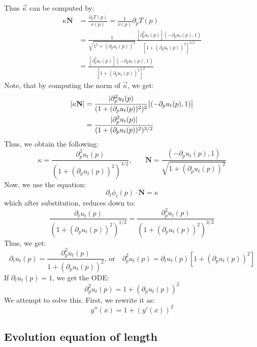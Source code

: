\documentclass{article}
\begin{document}
Thus $\vec{\kappa}$ can be computed by:
\begin{align*}
    \kappa\mathbf{N} &= \frac{\partial_p T(p)}{\nu(p)} = \frac{1}{\nu(p)}\partial_p T(p) \\
        &= \frac{1}{\sqrt{1^2 + (\partial_p u_t(p))^2}}\frac{[\partial_p^2 u_t(p)](-\partial_p u_t(p),1)}{[1+(\partial_p u_t(p))^2]^{3/2}} \\
        &= \frac{[\partial_p^2 u_t(p)](-\partial_p u_t(p),1)}{[1+(\partial_p u_t(p))^2]^2}
\end{align*}
Note, that by computing the norm of $\vec{\kappa}$, we get:
\begin{align*}
    |\kappa\mathbf{N}| &= \frac{|\partial_p^2 u_t(p)}{(1+(\partial_p u_t(p))^2)^2}\big{|}(-\partial_p u_t(p),1)\big{|} \\
    &= \frac{|\partial_p^2 u_t(p)|}{(1+(\partial_p u_t(p))^2)^{3/2}}
\end{align*}
Thus, we obtain the following:
\[ \kappa = \frac{\partial_p^2 u_t(p)}{(1+(\partial_p u_t(p))^2)^{3/2}}\text{,}\qquad \mathbf{N} = \frac{(-\partial_p u_t(p),1)}{\sqrt{1+(\partial_p u_t(p))^2}}\]
Now, we use the equation:
\[ \partial_t \phi_t(p)\cdot \mathbf{N} = \kappa \]
which after substitution, reduces down to:
\[ \frac{\partial_t u_t(p)}{(1+(\partial_p u_t(p))^2)^{1/2}} = \frac{\partial_p^2 u_t(p)}{(1+(\partial_p u_t(p))^2)^{3/2}} \]
Thus, we get:
\[ \partial_t u_t(p) = \frac{\partial_p^2 u_t(p)}{1+(\partial_p u_t(p))^2}\text{, or}\quad \partial_p^2 u_t(p) = \partial_t u_t(p)[1+(\partial_p u_t(p))^2] \]
If $\partial_t u_t(p) = 1$, we get the ODE:
\[ \partial_p^2 u_t(p) = 1+(\partial_p u_t(p))^2 \]
We attempt to solve this. First, we rewrite it as:
\[ y''(x) = 1  + (y'(x))^2 \]

\subsection{Evolution equation of length}
\end{document}
